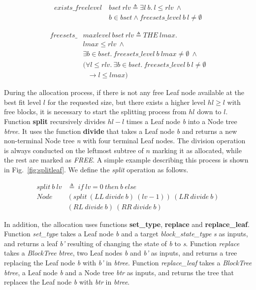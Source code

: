\begin{definition} 
\begin{align*}
exists\_freelevel\ &bset\ rlv \triangleq \exists l\ b.\ l \leq rlv\ \wedge\\
&b \in bset \wedge freesets\_level\ b\ l \ne \emptyset
\end{align*}
\end{definition}

\begin{definition} 
\begin{align*}
freesets\_&maxlevel\ bset\ rlv \triangleq THE\ lmax.\\
&lmax \leq rlv\ \wedge\\
&\exists b \in bset.\ freesets\_level\ b\ lmax \neq \emptyset\ \wedge\\
&(\forall l \leq rlv.\ \exists b \in bset.\ freesets\_level\ b\ l \ne \emptyset\\
&\ \ \ \longrightarrow l \leq lmax)
\end{align*}
\end{definition}

During the allocation process, if there is not any free Leaf node available at the best fit level $l$ for the requested size, but there exists a higher level $hl \geq l$ with free blocks, it is necessary to start the splitting process from $hl$ down to $l$. Function \textbf{split} recursively divides $hl - l$ times a Leaf node \emph{b} into a Node tree \emph{btree}. It uses the function \textbf{divide} that takes a Leaf node \emph{b} and returns a new non-terminal Node tree \emph{n} with four terminal Leaf nodes. The division operation is always conducted on the leftmost subtree of $n$ marking it as allocated, while the rest are marked as \emph{FREE}. A simple example describing this process is shown in Fig.~\ref{fig:splitleaf}. We define the \emph{split} operation as follows.

\begin{definition} 
\begin{align*}
split\ b\ lv &\triangleq\ if\ lv = 0\ then\ b\ else\\
Node\ &(split\ (LL\ divide\ b)\ (lv - 1))\ (LR\ divide\ b)\\ 
&(RL\ divide\ b)\ (RR\ divide\ b)
\end{align*}
\end{definition}

In addition, the allocation uses functions \textbf{set\_type}, \textbf{replace} and \textbf{replace\_leaf}. Function \emph{set\_type} takes a Leaf node \emph{b} and a target \emph{block\_state\_type} \emph{s} as inputs, and returns a leaf \emph{b'} resulting of changing the state of \emph{b} to \emph{s}. Function \emph{replace} takes a \emph{BlockTree} \emph{btree}, two Leaf nodes \emph{b} and \emph{b'} as inputs, and returns a tree replacing the Leaf node \emph{b} with \emph{b'} in \emph{btree}. Function \emph{replace\_leaf} takes a \emph{BlockTree} \emph{btree}, a Leaf node \emph{b} and a Node tree \emph{btr} as inputs, and returns the tree that replaces the Leaf node \emph{b} with \emph{btr} in \emph{btree}.

